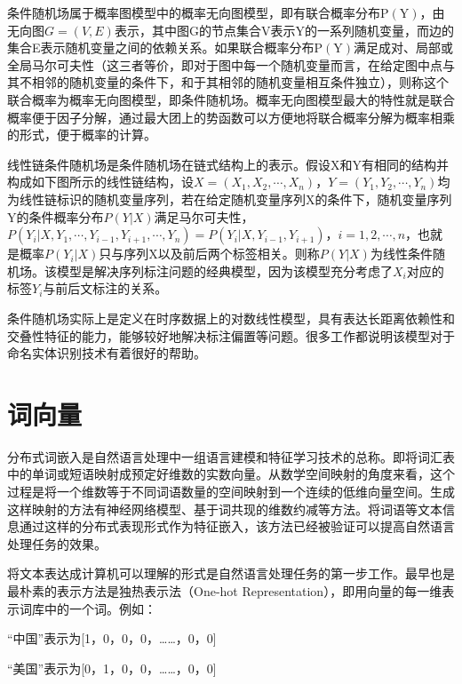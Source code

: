 \documentclass[winfonts,master,oneside,nobackinfo]{njuthesis}
\begin{document}
条件随机场属于概率图模型中的概率无向图模型，即有联合概率分布$\mathrm { P } (\mathrm { Y } )$，由无向图$G = ( V , E )$表示，其中图G的节点集合V表示Y的一系列随机变量，而边的集合E表示随机变量之间的依赖关系。如果联合概率分布$\mathrm { P } (\mathrm { Y } )$满足成对、局部或全局马尔可夫性（这三者等价，即对于图中每一个随机变量而言，在给定图中点与其不相邻的随机变量的条件下，和于其相邻的随机变量相互条件独立），则称这个联合概率为概率无向图模型，即条件随机场。概率无向图模型最大的特性就是联合概率便于因子分解，通过最大团上的势函数可以方便地将联合概率分解为概率相乘的形式，便于概率的计算。

线性链条件随机场是条件随机场在链式结构上的表示。假设X和Y有相同的结构并构成如下图所示的线性链结构，设$X = \left( X _ { 1 } , X _ { 2 } , \cdots , X _ { n } \right)$，$Y = \left( Y _ { 1 } , Y _ { 2 } , \cdots , Y _ { n } \right)$均为线性链标识的随机变量序列，若在给定随机变量序列X的条件下，随机变量序列Y的条件概率分布$P ( Y | X )$满足马尔可夫性，$P \left( Y _ { i } | X , Y _ { 1 } , \cdots , Y _ { i - 1 } , Y _ { i + 1 } , \cdots , Y _ { n } \right) = P \left( Y _ { i } | X , Y _ { i - 1 } , Y _ { i + 1 } \right)$，$i = 1,2 , \cdots , n$，也就是概率$P (Y_{i}|X)$只与序列X以及前后两个标签相关。则称$P ( Y | X )$为线性条件随机场。该模型是解决序列标注问题的经典模型，因为该模型充分考虑了$X _ { i }$对应的标签$Y _ { i }$与前后文标注的关系。



条件随机场实际上是定义在时序数据上的对数线性模型，具有表达长距离依赖性和交叠性特征的能力，能够较好地解决标注偏置等问题。很多工作\cite{Settles}都说明该模型对于命名实体识别技术有着很好的帮助。

\section{词向量}
分布式词嵌入是自然语言处理中一组语言建模和特征学习技术的总称。即将词汇表中的单词或短语映射成预定好维数的实数向量。从数学空间映射的角度来看，这个过程是将一个维数等于不同词语数量的空间映射到一个连续的低维向量空间。生成这样映射的方法有神经网络模型、基于词共现的维数约减等方法。将词语等文本信息通过这样的分布式表现形式作为特征嵌入，该方法已经被验证可以提高自然语言处理任务的效果。

将文本表达成计算机可以理解的形式是自然语言处理任务的第一步工作。最早也是最朴素的表示方法是独热表示法（One-hot Representation），即用向量的每一维表示词库中的一个词。例如：

“中国”表示为[1，0，0，0，……，0，0]

“美国”表示为[0，1，0，0，……，0，0]
\end{document}
